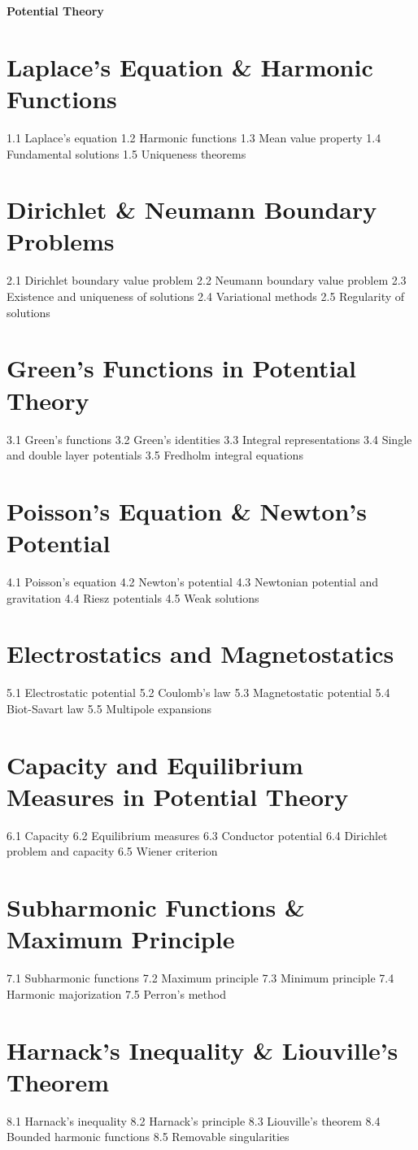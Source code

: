 {\LARGE \bf{Potential Theory}}
\section{Laplace's Equation \& Harmonic Functions}
1.1 Laplace's equation
1.2 Harmonic functions
1.3 Mean value property
1.4 Fundamental solutions
1.5 Uniqueness theorems
\section{Dirichlet \& Neumann Boundary Problems}
2.1 Dirichlet boundary value problem
2.2 Neumann boundary value problem
2.3 Existence and uniqueness of solutions
2.4 Variational methods
2.5 Regularity of solutions
\section{Green's Functions in Potential Theory}
3.1 Green's functions
3.2 Green's identities
3.3 Integral representations
3.4 Single and double layer potentials
3.5 Fredholm integral equations
\section{Poisson's Equation \& Newton's Potential}
4.1 Poisson's equation
4.2 Newton's potential
4.3 Newtonian potential and gravitation
4.4 Riesz potentials
4.5 Weak solutions
\section{Electrostatics and Magnetostatics}
5.1 Electrostatic potential
5.2 Coulomb's law
5.3 Magnetostatic potential
5.4 Biot-Savart law
5.5 Multipole expansions
\section{Capacity and Equilibrium Measures in Potential Theory}
6.1 Capacity
6.2 Equilibrium measures
6.3 Conductor potential
6.4 Dirichlet problem and capacity
6.5 Wiener criterion
\section{Subharmonic Functions \& Maximum Principle}
7.1 Subharmonic functions
7.2 Maximum principle
7.3 Minimum principle
7.4 Harmonic majorization
7.5 Perron's method
\section{Harnack's Inequality \& Liouville's Theorem}
8.1 Harnack's inequality
8.2 Harnack's principle
8.3 Liouville's theorem
8.4 Bounded harmonic functions
8.5 Removable singularities
